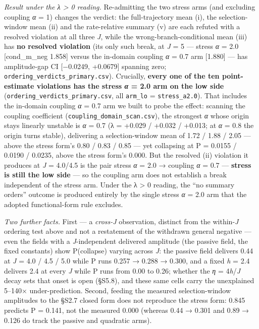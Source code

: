 \documentclass[11pt,letterpaper]{article}
\begin{document}
\emph{Result under the λ \textgreater{} 0 reading.} Re-admitting the two stress arms (and excluding coupling \emph{α} = 1) changes the verdict: the full-trajectory mean (i), the selection-window mean (ii) and the rate-relative summary (v) are each refuted with a resolved violation at all three \emph{J}, while the wrong-branch-conditional mean (iii) has \textbf{no resolved violation} (its only such break, at \emph{J} = 5 --- stress \emph{α} = 2.0 {[}cond\_m\_neg 1.858{]} versus the in-domain coupling \emph{α} = 0.7 arm {[}1.880{]} --- has amplitude-gap CI {[}−0.0249, +0.0679{]} spanning zero; \texttt{ordering\_verdicts\_primary.csv}). Crucially, \textbf{every one of the ten point-estimate violations has the stress \emph{α} = 2.0 arm on the low side} (\texttt{ordering\_verdicts\_primary.csv}, all \texttt{arm\_lo} = \texttt{stress\_a2.0}). That includes the in-domain coupling \emph{α} = 0.7 arm we built to probe the effect: scanning the coupling coefficient (\texttt{coupling\_domain\_scan.csv}), the strongest \emph{α} whose origin stays linearly unstable is \emph{α} = 0.7 (λ = +0.029 / +0.032 / +0.013; at \emph{α} = 0.8 the origin turns stable), delivering a selection-window mean of 1.72 / 1.88 / 2.05 --- above the stress form's 0.80 / 0.83 / 0.85 --- yet collapsing at P = 0.0155 / 0.0190 / 0.0235, above the stress form's 0.000. But the resolved (ii) violation it produces at \emph{J} = 4.0/4.5 is the pair stress \emph{α} = 2.0 → coupling \emph{α} = 0.7 --- \textbf{stress is still the low side} --- so the coupling arm does not establish a break independent of the stress arm. Under the λ \textgreater{} 0 reading, the ``no summary orders'' outcome is produced entirely by the single stress \emph{α} = 2.0 arm that the adopted functional-form rule excludes.

\emph{Two further facts.} First --- a \emph{cross-J} observation, distinct from the within-\emph{J} ordering test above and not a restatement of the withdrawn general negative --- even the fields with a \emph{J}-independent delivered amplitude (the passive field, the fixed constants) show P(collapse) varying across \emph{J}: the passive field delivers 0.44 at \emph{J} = 4.0 / 4.5 / 5.0 while P runs 0.257 → 0.288 → 0.300, and a fixed \emph{h} = 2.4 delivers 2.4 at every \emph{J} while P runs from 0.00 to 0.26; whether the \emph{η} = 4\emph{h}/\emph{J} decay sets that onset is open (§S5.8), and these same cells carry the unexplained 5--140× under-prediction. Second, feeding the measured selection-window amplitudes to the §S2.7 closed form does not reproduce the stress form: 0.845 predicts P = 0.141, not the measured 0.000 (whereas 0.44 → 0.301 and 0.89 → 0.126 do track the passive and quadratic arms).
\end{document}
